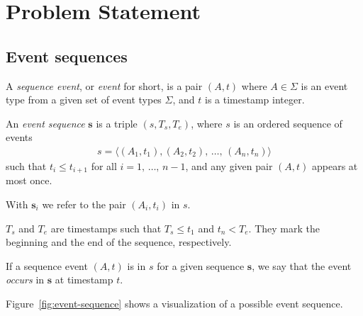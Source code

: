 \section{Problem Statement}

\subsection{Event sequences}

\begin{definition}
A \emph{sequence event}, or \emph{event} for short, is a pair $ (A, t) $ where $ A \in \Sigma $ is an event type from a given set of event types $ \Sigma $, and $ t $ is a timestamp integer.
\end{definition}

\begin{definition}
An \emph{event sequence} $ \boldsymbol{s} $ is a triple $ (s, T_s, T_e) $, where $ s $ is an ordered sequence of events
\begin{align*}
s = \langle (A_1, t_1), (A_2, t_2), \, \ldots, \, (A_n, t_n) \rangle
\end{align*}
such that $ t_i \leq t_{i + 1} $ for all $ i = 1, \, \ldots, \, n - 1 $, and any given pair $ (A, t) $ appears at most once.

With $ \boldsymbol{s}_i $ we refer to the pair $ (A_i, t_i) $ in $ s $.

$ T_s $ and $ T_e $ are timestamps such that $ T_s \leq t_1 $ and $ t_n < T_e $. They mark the beginning and the end of the sequence, respectively.

If a sequence event $ (A, t) $ is in $ s $ for a given sequence $ \boldsymbol{s} $, we say that the event \emph{occurs} in $ \boldsymbol{s} $ at timestamp $ t $.
\end{definition}

Figure~\ref{fig:event-sequence} shows a visualization of a possible event sequence.

\newcommand{\sequencetickmarks}[3]
{
    \pgfmathsetmacro\secondtickmark{#2+0.5}
    \pgfmathsetmacro\lasttickmark{#2+0.5*#1}

    \draw (#2,#3) -- (\lasttickmark,#3);

    \foreach \x in {#2,\secondtickmark,...,\lasttickmark}
        \draw (\x,#3) -- +(0,3pt);
}

\newcommand{\sequenceeventtypes}[4]
{
    \pgfmathsetlengthmacro\nodeheight{(#2)+(.8em)}

    \foreach \t/\eventtype [evaluate=\t as \x using (\t-#3)*0.5+(#1)] in {#4}
    {
        \node [font=\vphantom{$ fbd $}] at (\x,#2) {$ \eventtype $};
        \node (t\t) [inner sep=0] at (\x,\nodeheight) {};
    }
}

